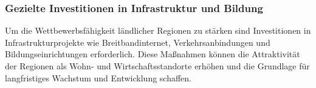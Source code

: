 \subsubsection{Gezielte Investitionen in Infrastruktur und Bildung}

Um die Wettbewerbsfähigkeit ländlicher Regionen zu stärken sind Investitionen in Infrastrukturprojekte wie Breitbandinternet, Verkehrsanbindungen und Bildungseinrichtungen erforderlich. Diese Maßnahmen können die Attraktivität der Regionen als Wohn- und Wirtschaftsstandorte erhöhen und die Grundlage für langfristiges Wachstum und Entwicklung schaffen.